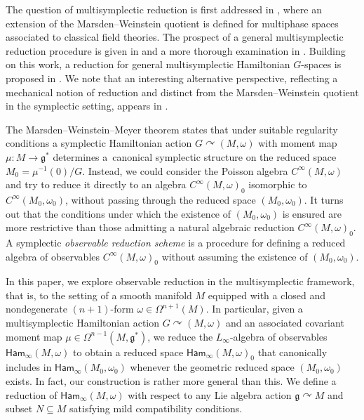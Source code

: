 \documentclass[pdftex]{sigma}
\numberwithin{equation}{section}
\newcommand{\g}{\mathfrak{g}}
\newcommand{\Ham}{\mathsf{Ham}}
\renewcommand{\subset}{\subseteq}
\begin{document}
The question of multisymplectic reduction is first addressed in \cite{Sniatycki04}, where an extension of the Marsden--Weinstein quotient is defined for multiphase spaces associated to classical field theories. The prospect of a general multisymplectic reduction procedure is given in \cite{MarsdenWeinstein01,OrtegaRatiu04} and a more thorough examination in \cite{Echeverria-Enriquez18}. Building on this work, a reduction for general multisymplectic Hamiltonian $G$-spaces is proposed in \cite{Blacker21}. We note that an interesting alternative perspective, reflecting a mechanical notion of reduction and distinct from the Marsden--Weinstein quotient in the symplectic setting, appears in \cite[Definition 4.2]{deLucasGraciaRivasRoman-RoyVilarino22}.


The Marsden--Weinstein--Meyer theorem \cite{MarsdenWeinstein74,Meyer73} states that under suitable regularity conditions a symplectic Hamiltonian action $G\curvearrowright(M,\omega)$ with moment map $\mu\colon M\to\g^*$ determines a~canonical symplectic structure on the reduced space $M_0=\mu^{-1}(0)/G$. Instead, we could consider the Poisson algebra $C^\infty(M,\omega)$ and try to reduce it directly to an algebra $C^\infty(M,\omega)_0$ isomorphic to $C^\infty(M_0,\omega_0)$, without passing through the reduced space $(M_0,\omega_0)$. It turns out that the conditions under which the existence of $(M_0,\omega_0)$ is ensured are more restrictive than those admitting a natural algebraic reduction  $C^\infty(M,\omega)_0$. A symplectic \emph{observable reduction scheme} is a procedure for defining a reduced algebra of observables $C^\infty(M,\omega)_0$ without assuming the existence of $(M_0,\omega_0)$.

In this paper, we explore observable reduction in the multisymplectic framework, that is, to the setting of a smooth manifold $M$ equipped with a closed and nondegenerate $(n+1)$-form $\omega\in\Omega^{n+1}(M)$. In particular, given a multisymplectic Hamiltonian action $G\curvearrowright(M,\omega)$ and an associated covariant moment map $\mu\in\Omega^{n-1}(M,\g^*)$, we reduce the $L_\infty$-algebra of observables $\Ham_\infty(M,\omega)$ to obtain a reduced space $\Ham_\infty(M,\omega)_0$ that canonically includes in $\Ham_\infty(M_0,\omega_0)$ whenever the geometric reduced space $(M_0,\omega_0)$ exists. In fact, our construction is rather more general than this. We define a reduction of $\Ham_\infty(M,\omega)$ with respect to any Lie algebra action $\g\curvearrowright M$ and subset $N\subset M$ satisfying mild compatibility conditions.
\end{document}
